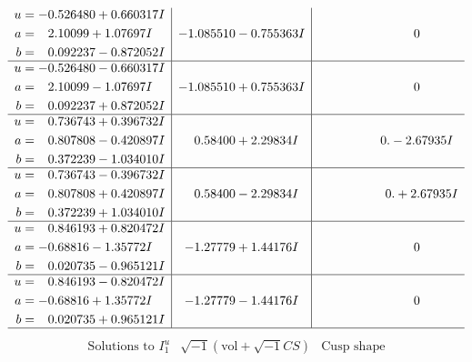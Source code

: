 \documentclass[1p]{elsarticle_modified}
\theoremstyle{definition}
\newcommand{\I}{\sqrt{-1}}
\begin{document}
$$\begin{array}{c|c|c}
\begin{aligned}
u &= -0.526480 + 0.660317 I \\
a &= \phantom{-}2.10099 + 1.07697 I \\
b &= \phantom{-}0.092237 - 0.872052 I\end{aligned}
 & -1.085510 - 0.755363 I & \phantom{-0.000000 } 0 \\ \hline\begin{aligned}
u &= -0.526480 - 0.660317 I \\
a &= \phantom{-}2.10099 - 1.07697 I \\
b &= \phantom{-}0.092237 + 0.872052 I\end{aligned}
 & -1.085510 + 0.755363 I & \phantom{-0.000000 } 0 \\ \hline\begin{aligned}
u &= \phantom{-}0.736743 + 0.396732 I \\
a &= \phantom{-}0.807808 - 0.420897 I \\
b &= \phantom{-}0.372239 - 1.034010 I\end{aligned}
 & \phantom{-}0.58400 + 2.29834 I & \phantom{-0.000000 } 0. - 2.67935 I \\ \hline\begin{aligned}
u &= \phantom{-}0.736743 - 0.396732 I \\
a &= \phantom{-}0.807808 + 0.420897 I \\
b &= \phantom{-}0.372239 + 1.034010 I\end{aligned}
 & \phantom{-}0.58400 - 2.29834 I & \phantom{-0.000000 -}0. + 2.67935 I \\ \hline\begin{aligned}
u &= \phantom{-}0.846193 + 0.820472 I \\
a &= -0.68816 - 1.35772 I \\
b &= \phantom{-}0.020735 - 0.965121 I\end{aligned}
 & -1.27779 + 1.44176 I & \phantom{-0.000000 } 0 \\ \hline\begin{aligned}
u &= \phantom{-}0.846193 - 0.820472 I \\
a &= -0.68816 + 1.35772 I \\
b &= \phantom{-}0.020735 + 0.965121 I\end{aligned}
 & -1.27779 - 1.44176 I & \phantom{-0.000000 } 0\\
 \hline 
 \end{array}$$\newpage$$\begin{array}{c|c|c}  
\text{Solutions to }I^u_{1}& \I (\text{vol} + \sqrt{-1}CS) & \text{Cusp shape}\\

\end{array}$$
\end{document}
